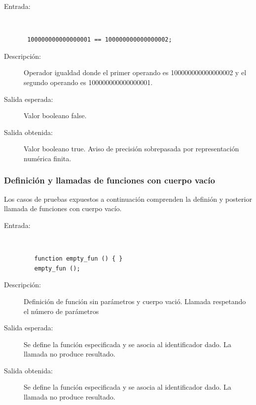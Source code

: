 \begin{framed}
	\begin{description}
		\item [Entrada:] \hfill \\
\begin{lstlisting}
 100000000000000001 == 100000000000000002;
\end{lstlisting}
		\item [Descripción:] Operador igualdad donde el primer operando es 100000000000000002 y el segundo operando es  100000000000000001.
		\item [Salida esperada:] Valor booleano false.
		\item [Salida obtenida:] Valor booleano true.  Aviso de precisión sobrepasada por representación numérica finita.
	\end{description}
\end{framed}

\subsubsection{Definición y llamadas de funciones con cuerpo vacío}

Los casos de pruebas expuestos a continuación comprenden la definión y posterior llamada de funciones con cuerpo vacío.

\begin{framed}
	\begin{description}
		\item [Entrada:] \hfill \\
\begin{lstlisting}
   function empty_fun () { } 
   empty_fun ();
\end{lstlisting}
		\item [Descripción:] Definición de función sin parámetros y cuerpo vació. Llamada respetando el número de parámetros
		\item [Salida esperada:] Se define la función especificada y se asocia al identificador dado. La llamada no produce resultado.
		\item [Salida obtenida:] Se define la función especificada y se asocia al identificador dado. La llamada no produce resultado.
	\end{description}
\end{framed}

